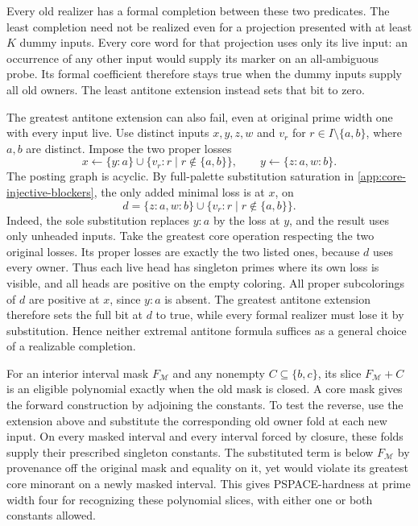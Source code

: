 Every old realizer has a formal completion between
these two predicates. The least completion need
not be realized even for a projection presented
with at least $K$ dummy inputs. Every core word
for that projection uses only its live input:
an occurrence of any other input would supply
its marker on an all-ambiguous probe. Its formal
coefficient therefore stays true when the dummy
inputs supply all old owners. The least antitone
extension instead sets that bit to zero.

The greatest antitone extension can also fail,
even at original prime width one with every input
live. Use distinct inputs $x,y,z,w$ and $v_r$ for
$r\in I\setminus\{a,b\}$, where $a,b$ are distinct.
Impose the two proper losses
\[
 x\gets\{y:a\}\cup\{v_r:r\mid r\notin\{a,b\}\},
 \qquad y\gets\{z:a,w:b\}.
\]
The posting graph is acyclic. By full-palette
substitution saturation in
\cref{app:core-injective-blockers}, the only added
minimal loss is at $x$, on
\[
 d=\{z:a,w:b\}\cup\{v_r:r\mid r\notin\{a,b\}\}.
\]
Indeed, the sole substitution replaces $y:a$ by
the loss at $y$, and the result uses only unheaded
inputs. Take the greatest core operation respecting
the two original losses. Its proper losses are
exactly the two listed ones, because $d$ uses every
owner. Thus each live head has singleton primes
where its own loss is visible, and all heads are
positive on the empty coloring. All proper
subcolorings of $d$ are positive at $x$, since
$y:a$ is absent. The greatest antitone extension
therefore sets the full bit at $d$ to true, while
every formal realizer must lose it by substitution.
Hence neither extremal antitone formula suffices
as a general choice of a realizable completion.

For an interior interval mask $F_{\mathcal M}$
and any nonempty $C\subseteq\{b,c\}$, its slice
$F_{\mathcal M}+C$ is an eligible polynomial
exactly when the old mask is closed. A core mask
gives the forward construction by adjoining the
constants. To test the reverse, use the extension
above and substitute the corresponding old owner
fold at each new input. On every masked interval
and every interval forced by closure, these folds
supply their prescribed singleton constants.
The substituted term is below $F_{\mathcal M}$
by provenance off the original mask and equality
on it, yet would violate its greatest core
minorant on a newly masked interval. This gives
PSPACE-hardness at prime width four for recognizing
these polynomial slices, with either one or both
constants allowed.

